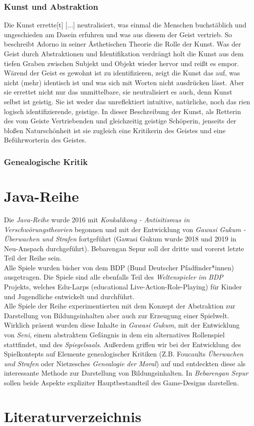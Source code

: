 \documentclass[a4paper, 12pt]{scrartcl}
\begin{document}
    \subsubsection{Kunst und Abstraktion} \label{kunst-abstraktion}
    Die Kunst \glqq errette[t] [...] neutralisiert, was einmal die Menschen buchstäblich und ungeschieden am Dasein erfuhren und was aus diesem der Geist vertrieb\grqq.\cite{adorno:ÄsthetischeTheorie}
    So beschreibt Adorno in seiner Ästhetischen Theorie die Rolle der Kunst. 
    Was der Geist durch Abstraktionen und Identifikation verdrängt holt die Kunst aus dem tiefen Graben zwischen Subjekt und Objekt wieder hervor und reißt es empor. 
    Wärend der Geist es gewohnt ist zu identifizieren, zeigt die Kunst das auf, was nicht (mehr) identisch ist und was sich mit Worten nicht ausdrücken lässt.
    Aber sie errettet nicht nur das unmittelbare, sie neutralisiert es auch, denn Kunst selbst ist geistig.
    Sie ist weder das unreflektiert intuitive, natürliche, noch das rien logisch identifizierende, geistige.
    In dieser Beschreibung der Kunst, als Retterin des vom Geiste Vertriebenden und gleichzeitig geistige Schöperin, jenseits der bloßen Naturschönheit ist sie zugleich eine Kritikerin des Geistes und eine Beführworterin des Geistes. 
    
    \subsubsection{Genealogische Kritik} \label{genealogische-kritik}

    \section{Java-Reihe} \label{java-reihe}
    Die \textit{Java-Reihe} wurde 2016 mit \textit{Konkalikong - Antisitismus in Verschwörungstheorien} begonnen und mit der Entwicklung von \textit{Gawasi Gukum - Überwachen und Strafen} fortgeführt (Gawasi Gukum wurde 2018 und 2019 in Neu-Anspach durchgeführt).
    Bebarengan Sepur soll der dritte und vorerst letzte Teil der Reihe sein.\\ 
    Alle Spiele wurden bisher von dem BDP (Bund Deutscher Pfadfinder*innen) ausgetragen. 
    Die Spiele sind alle ebenfalls Teil des \textit{Weltenspieler im BDP} Projekts, welches Edu-Larps (educational Live-Action-Role-Playing) für Kinder und Jugendliche entwickelt und durchführt. \\
    Alle Spiele der Reihe experimentierten mit dem Konzept der Abstraktion zur Darstellung von Bildungsinhalten aber auch zur Erzeugung einer Spielwelt. 
    Wirklich präsent wurden diese Inhalte in \textit{Gawasi Gukum}, mit der Entwicklung von \textit{Seni}, einem abstraktem Gefängnis in dem ein alternatives Rollenspiel stattfindet, und des \textit{Spiegelsaals}.
    Außerdem griffen wir bei der Entwicklung des Spielkontepts auf Elemente genealogischer Kritiken (Z.B. Foucaults \textit{Überwachen und Strafen} oder Nietzesches \textit{Genealogie der Moral}) auf und entdeckten diese als interessante Methode zur Darstellung von Bildungsinhalten.
    In \textit{Bebarengan Sepur} sollen beide Aspekte expliziter Hauptbestandteil des Game-Designs darstellen. 

    \section{Literaturverzeichnis}

 

  
\end{document}
